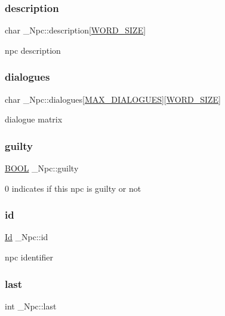 \subsubsection{\texorpdfstring{description}{description}}
{\footnotesize\ttfamily char \+\_\+\+Npc\+::description\mbox{[}\hyperlink{types_8h_a92ed8507d1cd2331ad09275c5c4c1c89}{W\+O\+R\+D\+\_\+\+S\+I\+ZE}\mbox{]}}

npc description \mbox{\label{struct__Npc_ab50ed0ce16e8452ac34a78f5b20e0cd8}} 
\subsubsection{\texorpdfstring{dialogues}{dialogues}}
{\footnotesize\ttfamily char \+\_\+\+Npc\+::dialogues\mbox{[}\hyperlink{npc_8h_a0f3f5f7d4d9b807bb98112298f9562ca}{M\+A\+X\+\_\+\+D\+I\+A\+L\+O\+G\+U\+ES}\mbox{]}\mbox{[}\hyperlink{types_8h_a92ed8507d1cd2331ad09275c5c4c1c89}{W\+O\+R\+D\+\_\+\+S\+I\+ZE}\mbox{]}}

dialogue matrix \mbox{\label{struct__Npc_a1a0787e39c21214fbe4076784d31146b}} 
\subsubsection{\texorpdfstring{guilty}{guilty}}
{\footnotesize\ttfamily \hyperlink{types_8h_a3e5b8192e7d9ffaf3542f1210aec18dd}{B\+O\+OL} \+\_\+\+Npc\+::guilty}

0 indicates if this npc is guilty or not \mbox{\label{struct__Npc_aff473e7ff7ee46f9fcd3bc47f369ce85}} 
\subsubsection{\texorpdfstring{id}{id}}
{\footnotesize\ttfamily \hyperlink{types_8h_a845e604fb28f7e3d97549da3448149d3}{Id} \+\_\+\+Npc\+::id}

npc identifier \mbox{\label{struct__Npc_ab004908c0334b1213d97ee2f58368639}} 
\subsubsection{\texorpdfstring{last}{last}}
{\footnotesize\ttfamily int \+\_\+\+Npc\+::last}

